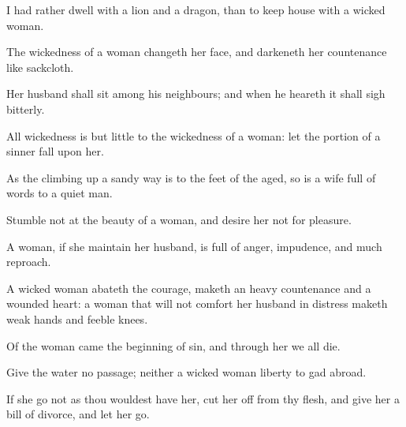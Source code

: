 {\par }{\PP {}I had rather dwell with a lion and a dragon, than to keep house with a wicked woman.
\par }{\PP {}The wickedness of a woman changeth her face, and darkeneth her countenance like sackcloth.
\par }{\PP {}Her husband shall sit among his neighbours; and when he heareth it shall sigh bitterly.
\par }{\PP {}All wickedness is but little to the wickedness of a woman: let the portion of a sinner fall upon her.
\par }{\PP {}As the climbing up a sandy way is to the feet of the aged, so is a wife full of words to a quiet man.
\par }{\PP {}Stumble not at the beauty of a woman, and desire her not for pleasure.
\par }{\PP {}A woman, if she maintain her husband, is full of anger, impudence, and much reproach.
\par }{\PP {}A wicked woman abateth the courage, maketh an heavy countenance and a wounded heart: a woman that will not comfort her husband in distress maketh weak hands and feeble knees.
\par }{\PP {}Of the woman came the beginning of sin, and through her we all die.
\par }{\PP {}Give the water no passage; neither a wicked woman liberty to gad abroad.
\par }{\PP {}If she go not as thou wouldest have her, cut her off from thy flesh, and give her a bill of divorce, and let her go.

}
